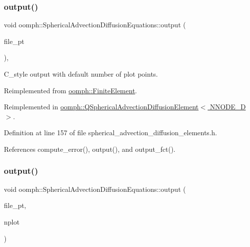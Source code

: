 \subsubsection{\texorpdfstring{output()}{output()}\hspace{0.1cm}{\footnotesize\ttfamily [3/4]}}
{\footnotesize\ttfamily void oomph\+::\+Spherical\+Advection\+Diffusion\+Equations\+::output (\begin{DoxyParamCaption}\item[{F\+I\+LE $\ast$}]{file\+\_\+pt }\end{DoxyParamCaption})\hspace{0.3cm}{\ttfamily [inline]}, {\ttfamily [virtual]}}



C\+\_\+style output with default number of plot points. 



Reimplemented from \hyperlink{classoomph_1_1FiniteElement_a72cddd09f8ddbee1a20a1ff404c6943e}{oomph\+::\+Finite\+Element}.



Reimplemented in \hyperlink{classoomph_1_1QSphericalAdvectionDiffusionElement_a160d448e9026e125714d38a4550676a4}{oomph\+::\+Q\+Spherical\+Advection\+Diffusion\+Element$<$ N\+N\+O\+D\+E\+\_\+D $>$}.



Definition at line 157 of file spherical\+\_\+advection\+\_\+diffusion\+\_\+elements.\+h.



References compute\+\_\+error(), output(), and output\+\_\+fct().

\mbox{\label{classoomph_1_1SphericalAdvectionDiffusionEquations_a79afec7f557484e3b17cc969f4a1ea1f}} 
\subsubsection{\texorpdfstring{output()}{output()}\hspace{0.1cm}{\footnotesize\ttfamily [4/4]}}
{\footnotesize\ttfamily void oomph\+::\+Spherical\+Advection\+Diffusion\+Equations\+::output (\begin{DoxyParamCaption}\item[{F\+I\+LE $\ast$}]{file\+\_\+pt,  }\item[{const unsigned \&}]{nplot }\end{DoxyParamCaption})\hspace{0.3cm}{\ttfamily [virtual]}}



